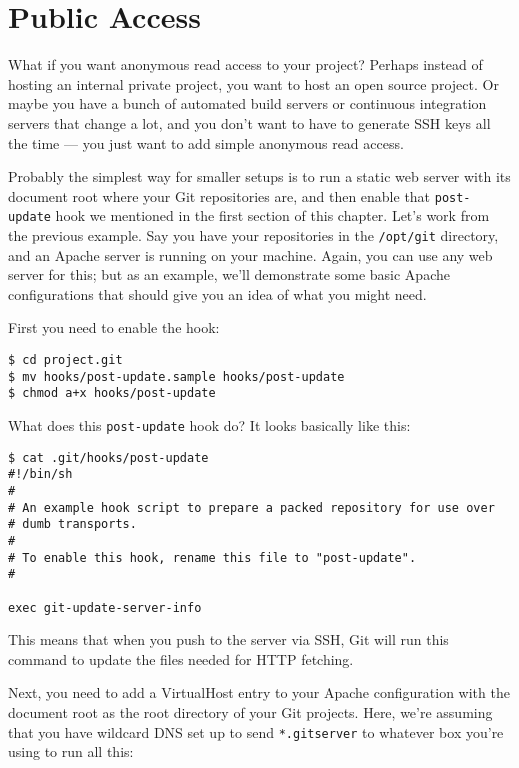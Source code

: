 \documentclass[a4paper]{book}
\begin{document}
\section{Public Access}\label{public-access}

What if you want anonymous read access to your project? Perhaps instead of hosting an internal private project, you want to host an open source project. Or maybe you have a bunch of automated build servers or continuous integration servers that change a lot, and you don't want to have to generate SSH keys all the time --- you just want to add simple anonymous read access.

Probably the simplest way for smaller setups is to run a static web server with its document root where your Git repositories are, and then enable that \texttt{post-update} hook we mentioned in the first section of this chapter. Let's work from the previous example. Say you have your repositories in the \texttt{/opt/git} directory, and an Apache server is running on your machine. Again, you can use any web server for this; but as an example, we'll demonstrate some basic Apache configurations that should give you an idea of what you might need.

First you need to enable the hook:

\begin{shaded}\begin{verbatim}
$ cd project.git
$ mv hooks/post-update.sample hooks/post-update
$ chmod a+x hooks/post-update
\end{verbatim}\end{shaded}

What does this \texttt{post-update} hook do? It looks basically like this:

\begin{shaded}\begin{verbatim}
$ cat .git/hooks/post-update
#!/bin/sh
#
# An example hook script to prepare a packed repository for use over
# dumb transports.
#
# To enable this hook, rename this file to "post-update".
#

exec git-update-server-info
\end{verbatim}\end{shaded}

This means that when you push to the server via SSH, Git will run this command to update the files needed for HTTP fetching.

Next, you need to add a VirtualHost entry to your Apache configuration with the document root as the root directory of your Git projects. Here, we're assuming that you have wildcard DNS set up to send \texttt{*.gitserver} to whatever box you're using to run all this:
\end{document}
